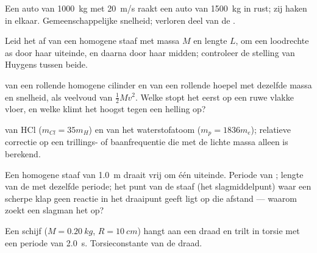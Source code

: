 \begin{exercise}[$\star$]\label{exo:b1:systems-of-points:3}
Een auto van \qty{1000}{kg} met \qty{20}{m/s} raakt een auto van \qty{1500}{kg} in rust;
zij haken in elkaar. Gemeenschappelijke snelheid; verloren deel van de .
\end{exercise}

\begin{exercise}[$\star$]\label{exo:b1:systems-of-points:4}
Leid het  af van een homogene staaf met massa $M$ en lengte $L$,
om een loodrechte as door haar uiteinde, en daarna door haar midden;
controleer de stelling van Huygens tussen beide.
\end{exercise}

\begin{exercise}[$\star\star$]\label{exo:b1:systems-of-points:5}
 van een rollende homogene cilinder en van een rollende hoepel
met dezelfde massa en snelheid, als veelvoud van $\tfrac12 Mv^2$. Welke stopt
het eerst op een ruwe vlakke vloer, en welke klimt het hoogst tegen een helling op?
\end{exercise}

\begin{exercise}[$\star\star$]\label{exo:b1:systems-of-points:6}
 van HCl ($m_{Cl} = 35m_H$) en van het waterstofatoom
($m_p = 1836m_e$); relatieve correctie op een trillings- of baanfrequentie
die met de lichte massa alleen is berekend.
\end{exercise}

\begin{exercise}[$\star\star$]\label{exo:b1:systems-of-points:7}
Een homogene staaf van \qty{1.0}{m} draait vrij om één uiteinde. Periode
van ; lengte van de  met dezelfde
periode; het punt van de staaf (het slagmiddelpunt) waar een scherpe
klap geen reactie in het draaipunt geeft ligt op die afstand --- waarom zoekt
een slagman het op?
\end{exercise}

\begin{exercise}[$\star\star$]\label{exo:b1:systems-of-points:8}
Een schijf ($M = \qty{0.20}{kg}$, $R = \qty{10}{cm}$) hangt aan een draad en
trilt in torsie met een periode van \qty{2.0}{s}. Torsieconstante van
de draad.
\end{exercise}

